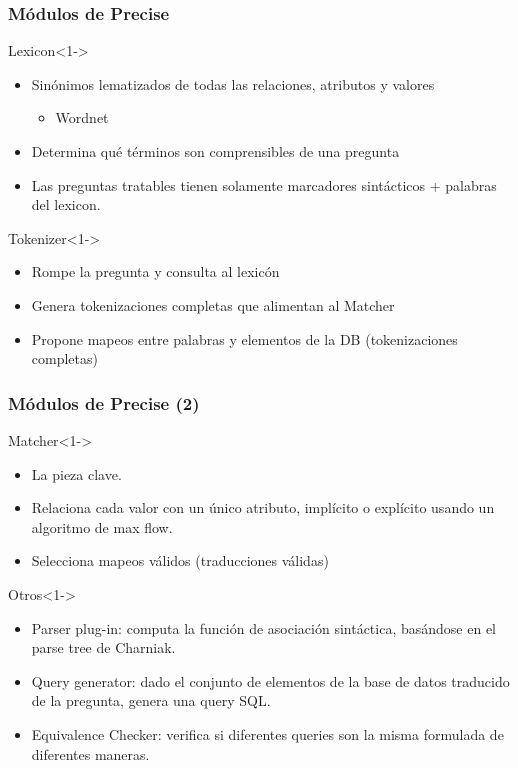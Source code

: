 \fontsize{9.5pt}{7.2}\selectfont
\begin{frame}
\frametitle{Módulos de Precise}
   \begin{block}{Lexicon}<1->
      \begin{itemize}
          \item Sinónimos lematizados de todas las relaciones, atributos y valores
          \begin{itemize}
            \item Wordnet
          \end{itemize}
          \item Determina qué términos son comprensibles de una pregunta
          \item Las preguntas tratables tienen solamente marcadores sintácticos + palabras del lexicon.
        \end{itemize}
    \end{block}
    \begin{block}{Tokenizer}<1->
      \begin{itemize}
          \item Rompe la pregunta y consulta al lexicón
          \item Genera tokenizaciones completas que alimentan al Matcher
          \item Propone mapeos entre palabras y elementos de la DB (tokenizaciones completas)
      \end{itemize}
    \end{block}
  
\end{frame}

\begin{frame}
\frametitle{Módulos de Precise (2)}

    \begin{block}{Matcher}<1->
      \begin{itemize}
          \item La pieza clave.
          \item Relaciona cada valor con un único atributo, implícito o explícito usando un algoritmo de max flow.
          \item Selecciona mapeos válidos (traducciones válidas)
      \end{itemize}
    \end{block}
    \begin{block}{Otros}<1->
      \begin{itemize}
        \item Parser plug-in: computa la función de asociación sintáctica, basándose en el parse tree de Charniak.
        \item Query generator: dado el conjunto de elementos de la base de datos traducido de la pregunta, genera una query SQL.
        \item Equivalence Checker: verifica si diferentes queries son la misma formulada de diferentes maneras.
      \end{itemize}
    \end{block}
\end{frame}


